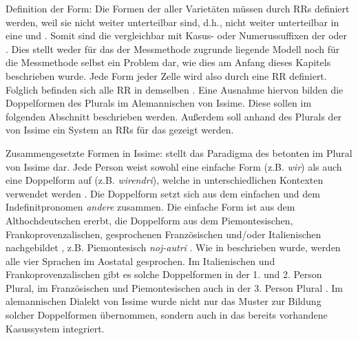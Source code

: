 {Definition der Form}: Die Formen der  aller Varietäten müssen durch RRs definiert werden, weil sie nicht weiter unterteilbar sind, d.h., nicht weiter unterteilbar in eine  und . Somit sind die  vergleichbar mit Kasus- oder Numerussuffixen der  oder . Dies stellt weder für das der Messmethode zugrunde liegende Modell noch für die Messmethode selbst ein Problem dar, wie dies am Anfang dieses Kapitels beschrieben wurde. Jede Form jeder Zelle wird also durch eine RR definiert. Folglich befinden sich alle RR in demselben . Eine Ausnahme hiervon bilden die Doppelformen des Plurals im Alemannischen von Issime. Diese sollen im folgenden Abschnitt beschrieben werden. Außerdem soll anhand des Plurals der  von Issime ein System an RRs für das  gezeigt werden.

{Zusammengesetzte Formen in Issime}:  stellt das Paradigma des betonten  im Plural von Issime dar. Jede Person weist sowohl eine einfache Form (z.B. \textit{wir}) als auch eine Doppelform auf (z.B. \textit{wirendri}), welche in unterschiedlichen Kontexten verwendet werden \citep[216-221]{Zürrer1999}. Die Doppelform setzt sich aus dem einfachen  und dem Indefinitpronomen \textit{andere} zusammen. Die einfache Form ist aus dem Althochdeutschen ererbt, die Doppelform aus dem Piemontesischen, Frankoprovenzalischen, gesprochenen Französischen und/oder Italienischen nachgebildet \citep[215]{Zürrer1999}, z.B. Piemontesisch \textit{noj-autri} \citep[72]{BreroBertodatti1988}. Wie in  beschrieben wurde, werden alle vier Sprachen im Aostatal gesprochen. Im Italienischen und Frankoprovenzalischen gibt es solche Doppelformen in der 1. und 2. Person Plural, im Französischen und Piemontesischen auch in der 3. Person Plural \citep[215]{Zürrer1999}. Im alemannischen Dialekt von Issime wurde nicht nur das Muster zur Bildung solcher Doppelformen übernommen, sondern auch in das bereits vorhandene Kasussystem integriert.



